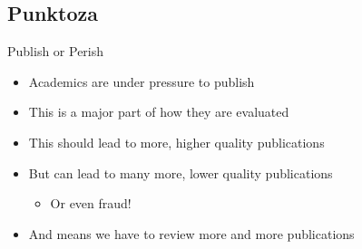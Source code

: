 \documentclass[aspectratio=169]{beamer}
\begin{document}
\subsection{Punktoza}
\begin{frame}{Publish or Perish}

  \begin{itemize}
  \item Academics are under pressure to publish
  \item This is a major part of how they are evaluated
  \item This should lead to more, higher quality publications
  \item But can lead to many more, lower  quality publications
    \begin{itemize}
    \item Or even fraud!
    \end{itemize}
  \item And means we have to review more and more publications
  \end{itemize}
  
\end{frame}
\end{document}

